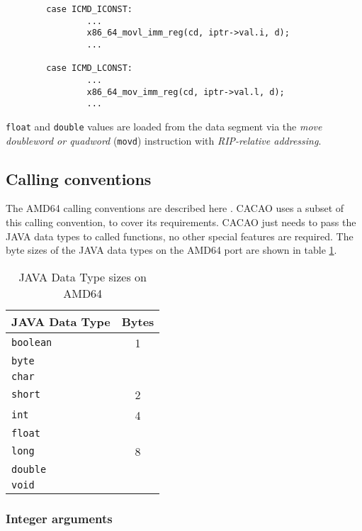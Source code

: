\begin{verbatim}
        case ICMD_ICONST:
                ...
                x86_64_movl_imm_reg(cd, iptr->val.i, d);
                ...

        case ICMD_LCONST:
                ...
                x86_64_mov_imm_reg(cd, iptr->val.l, d);
                ...
\end{verbatim}

\texttt{float} and \texttt{double} values are loaded from the data
segment via the \textit{move doubleword or quadword} (\texttt{movd})
instruction with \textit{RIP-relative addressing}.


\subsection{Calling conventions}

The AMD64 calling conventions are described here
\cite{AMD64ABI}. CACAO uses a subset of this calling convention, to
cover its requirements. CACAO just needs to pass the JAVA data types
to called functions, no other special features are required. The byte
sizes of the JAVA data types on the AMD64 port are shown in table
\ref{javadatatypesizes}.

\begin{table}
\begin{center}
\begin{tabular}[b]{|l|c|}
\hline
JAVA Data Type   & Bytes \\ \hline
\texttt{boolean} & 1     \\
\texttt{byte}    &       \\
\texttt{char}    &       \\ \hline
\texttt{short}   & 2     \\ \hline
\texttt{int}     & 4     \\
\texttt{float}   &       \\ \hline
\texttt{long}    & 8     \\
\texttt{double}  &       \\
\texttt{void}    &       \\ \hline
\end{tabular}
\caption{JAVA Data Type sizes on AMD64}
\label{javadatatypesizes}
\end{center}
\end{table}

\subsubsection{Integer arguments}

